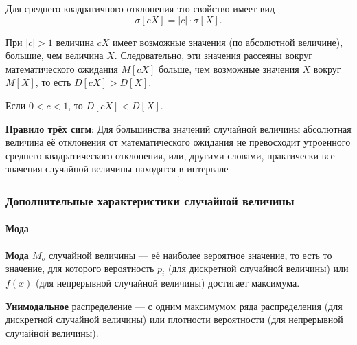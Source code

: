 \documentclass[a4paper]{article}
\newcommand{\key}[1]{{\color{Medium}\bfseries #1}}
\begin{document}
\begin{enumerate}
                        Для среднего квадратичного отклонения это свойство имеет вид
                        \begin{equation*}
                            \sigma [c X] = |c| \cdot \sigma [X] .
                        \end{equation*}
                    \end{enumerate}

                    При $|c| > 1$ величина $c X$ имеет возможные значения (по абсолютной величине), большие, чем величина $X$. Следовательно, эти значения рассеяны вокруг математического ожидания $M[c X]$ больше, чем возможные значения $X$ вокруг $M[X]$, то есть $D[c X] > D[X]$.
                    
                    Если $0 < c < 1$, то $D[c X] < D[X]$.

                    \key{Правило трёх сигм}: \newline
                    Для большинства значений случайной величины абсолютная величина её отклонения от математического ожидания не превосходит утроенного среднего квадратического отклонения, или, другими словами, практически все значения случайной величины находятся в интервале
                    \begin{equation*}
                        [m - 3 \sigma ; \: m + 3 \sigma] .
                    \end{equation*}

            \subsubsection{Дополнительные характеристики случайной величины}

                \paragraph{Мода}
            
                    \key{Мода \boldmath$M_o$} случайной величины --- её наиболее вероятное значение, то есть то значение, для которого вероятность $p_i$ (для дискретной случайной величины) или $f(x)$ (для непрерывной случайной величины) достигает максимума.

                    \key{Унимодальное} распределение --- с одним максимумом ряда распределения (для дискретной случайной величины) или плотности вероятности (для непрерывной случайной величины).
                        
\end{document}
